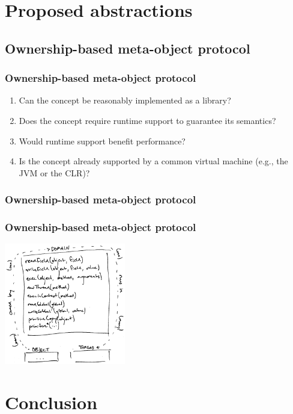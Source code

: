 \documentclass{beamer}
\begin{document}
  \section{Proposed abstractions}

  \subsection{Ownership-based meta-object protocol}

  \begin{frame}
    \frametitle{Ownership-based meta-object protocol}

    \begin{enumerate}
      \item Can the concept be reasonably implemented as a library?
      \item Does the concept require runtime support to guarantee its semantics?
      \item Would runtime support benefit performance?
      \item Is the concept already supported by a common virtual machine (e.g., the JVM or the CLR)?
    \end{enumerate}
  \end{frame}

  \begin{frame}
    \frametitle{Ownership-based meta-object protocol}
  \end{frame}

  \begin{frame}
    \frametitle{Ownership-based meta-object protocol}

    \centering

    \includegraphics[width=150pt]{obmop}
  \end{frame}

  \section{Conclusion}
\end{document}
